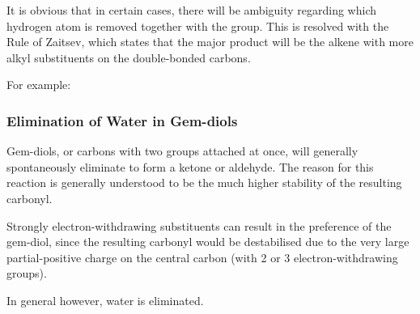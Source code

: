 				It is obvious that in certain cases, there will be ambiguity regarding which hydrogen atom is removed together with the 
				group. This is resolved with the Rule of Zaitsev, which states that the major product will be the alkene with more alkyl
				substituents on the double-bonded carbons.

				For example:



			\pagebreak
			\subsubsection{Elimination of Water in Gem-diols}

				Gem-diols, or carbons with two  groups attached at once, will generally spontaneously eliminate  to form a
				ketone or aldehyde. The reason for this reaction is generally understood to be the much higher stability of the resulting
				carbonyl.

				Strongly electron-withdrawing substituents can result in the preference of the gem-diol, since the resulting carbonyl
				would be destabilised due to the very large partial-positive charge on the central carbon (with 2 or 3 electron-withdrawing groups).

				In general however, water is eliminated.



